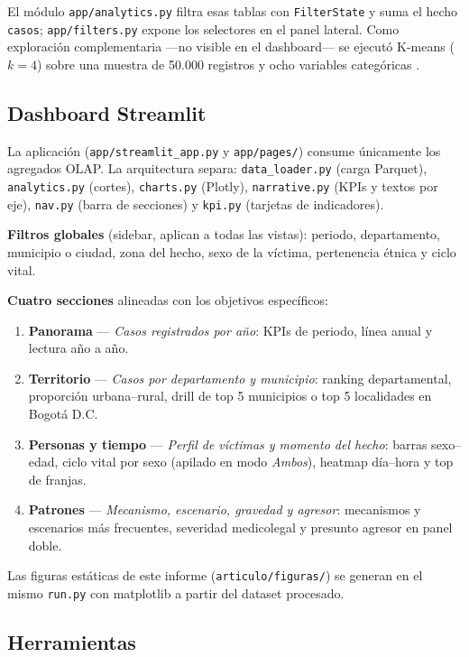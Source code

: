 \documentclass[
	a4paper,
	10pt,
	unnumberedsections,
	twoside,
]{LTJournalArticle}
\begin{document}
El m\'odulo \texttt{app/analytics.py} filtra esas tablas con \texttt{FilterState} y suma el hecho \texttt{casos}; \texttt{app/filters.py} expone los selectores en el panel lateral.
Como exploraci\'on complementaria ---no visible en el dashboard--- se ejecut\'o K-means ($k=4$) sobre una muestra de 50.000 registros y ocho variables categ\'oricas \cite{pedregosa2011sklearn}.

\subsection{Dashboard Streamlit}

La aplicaci\'on (\texttt{app/streamlit\_app.py} y \texttt{app/pages/}) consume \'unicamente los agregados OLAP.
La arquitectura separa: \texttt{data\_loader.py} (carga Parquet), \texttt{analytics.py} (cortes), \texttt{charts.py} (Plotly), \texttt{narrative.py} (KPIs y textos por eje), \texttt{nav.py} (barra de secciones) y \texttt{kpi.py} (tarjetas de indicadores).

\textbf{Filtros globales} (sidebar, aplican a todas las vistas): periodo, departamento, municipio o ciudad, zona del hecho, sexo de la v\'ictima, pertenencia \'etnica y ciclo vital.

\textbf{Cuatro secciones} alineadas con los objetivos espec\'ificos:

\begin{enumerate}
	\item \textbf{Panorama} --- \emph{Casos registrados por a\~{n}o}: KPIs de periodo, l\'inea anual y lectura a\~{n}o a a\~{n}o.
	\item \textbf{Territorio} --- \emph{Casos por departamento y municipio}: ranking departamental, proporci\'on urbana--rural, drill de top 5 municipios o top 5 localidades en Bogot\'a D.C.
	\item \textbf{Personas y tiempo} --- \emph{Perfil de v\'ictimas y momento del hecho}: barras sexo--edad, ciclo vital por sexo (apilado en modo \emph{Ambos}), heatmap d\'ia--hora y top de franjas.
	\item \textbf{Patrones} --- \emph{Mecanismo, escenario, gravedad y agresor}: mecanismos y escenarios m\'as frecuentes, severidad medicolegal y presunto agresor en panel doble.
\end{enumerate}

Las figuras est\'aticas de este informe (\texttt{articulo/figuras/}) se generan en el mismo \texttt{run.py} con matplotlib a partir del dataset procesado.

\subsection{Herramientas}
\end{document}
